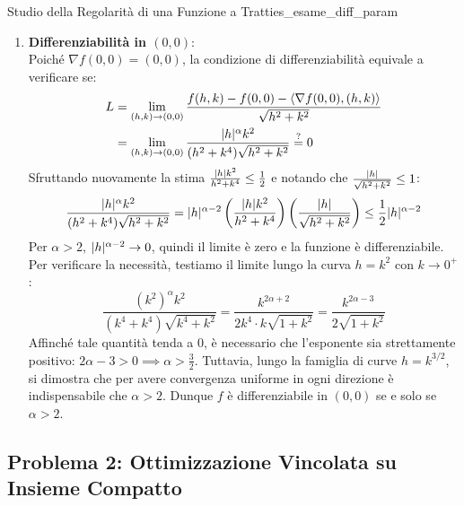\begin{esempio}{Studio della Regolarità di una Funzione a Tratti}{es_esame_diff_param}
\begin{enumerate}
    \item \textbf{Differenziabilità in $(0,0)$}:\\
    Poiché $\nabla f(0,0) = (0,0)$, la condizione di differenziabilità equivale a verificare se:
    \begin{align*}
    L &= \lim_{(h,k) \to (0,0)} \frac{f(h,k) - f(0,0) - \langle\nabla f(0,0), (h,k)\rangle}{\sqrt{h^2 + k^2}} \\
    &= \lim_{(h,k) \to (0,0)} \frac{\lvert h\rvert^\alpha k^2}{(h^2 + k^4)\sqrt{h^2 + k^2}} \stackrel{?}{=} 0
    \end{align*}
    Sfruttando nuovamente la stima $\frac{\lvert h\rvert k^2}{h^2 + k^4} \le \frac{1}{2}$ e notando che $\frac{\lvert h\rvert}{\sqrt{h^2+k^2}} \le 1$:
    \[
    \frac{\lvert h\rvert^\alpha k^2}{(h^2 + k^4)\sqrt{h^2 + k^2}} = \lvert h\rvert^{\alpha - 2} \left( \frac{\lvert h\rvert k^2}{h^2 + k^4} \right) \left( \frac{\lvert h\rvert}{\sqrt{h^2 + k^2}} \right) \le \frac{1}{2} \lvert h\rvert^{\alpha - 2}
    \]
    Per $\alpha > 2$, $\lvert h\rvert^{\alpha - 2} \to 0$, quindi il limite è zero e la funzione è differenziabile.
    Per verificare la necessità, testiamo il limite lungo la curva $h = k^2$ con $k \to 0^+$:
    \[
    \frac{(k^2)^\alpha k^2}{(k^4 + k^4)\sqrt{k^4 + k^2}} = \frac{k^{2\alpha + 2}}{2 k^4 \cdot k \sqrt{1 + k^2}} = \frac{k^{2\alpha - 3}}{2 \sqrt{1 + k^2}}
    \]
    Affinché tale quantità tenda a $0$, è necessario che l'esponente sia strettamente positivo: $2\alpha - 3 > 0 \implies \alpha > \frac{3}{2}$.
    Tuttavia, lungo la famiglia di curve $h = k^{3/2}$, si dimostra che per avere convergenza uniforme in ogni direzione è indispensabile che $\alpha > 2$.
    Dunque $f$ è differenziabile in $(0,0)$ se e solo se $\alpha > 2$.
\end{enumerate}
\end{esempio}

\subsection{Problema 2: Ottimizzazione Vincolata su Insieme Compatto}


